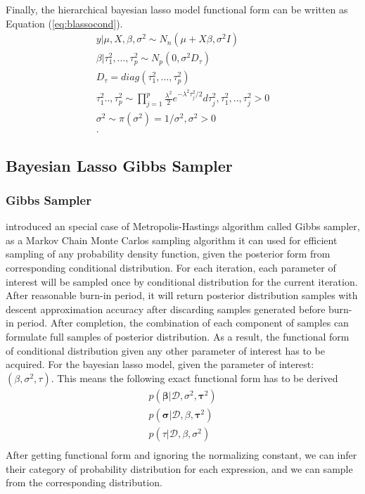 Finally, the hierarchical bayesian lasso model functional form can be written as Equation (\ref{eq:blassocond}).
\begin{equation}
	\label{eq:blassocond}
	\begin{multlined}
	y|\mu,X,\beta,\sigma^2 \sim N_n(\mu + X\beta,\sigma^2I)\\
	\beta|\tau_1^2,...,\tau_p^2 \sim N_p(0,\sigma^2D_{\tau})\\
	D_{\tau} = diag(\tau_1^2,...,\tau_p^2)\\
	\tau_1^2..,\tau_p^2 \sim \prod_{j=1}^p \frac{\lambda^2}{2} e^{-\lambda^2\tau_j^2/2}d\tau_j^2, \tau_1^2,..,\tau_j^2 > 0\\
	\sigma^2 \sim \pi(\sigma^2) = 1/\sigma^2, \sigma^2 > 0\\.
	\end{multlined}
\end{equation}

\subsection{Bayesian Lasso Gibbs Sampler}
\subsubsection{Gibbs Sampler}
\cite{4767596} introduced an special case of Metropolis-Hastings algorithm called Gibbs sampler, as a Markov Chain Monte Carlos sampling algorithm it can used for efficient sampling of any probability density function, given the posterior form from corresponding conditional distribution. For each iteration, each parameter of interest will be sampled once by conditional distribution for the current iteration. After reasonable burn-in period, it will return posterior distribution samples with descent approximation accuracy after discarding samples generated before burn-in period.
After completion, the combination of each component of samples can formulate full samples of posterior distribution. As a result, the functional form of conditional distribution given any other parameter of interest has to be acquired. For the bayesian lasso model, given the parameter of interest: $(\beta,\sigma^2,\tau)$. This means the following exact functional form has to be derived
\begin{equation}
	\begin{multlined}
	p(\mathbf{\beta}|\mathcal{D},\sigma^2,\mathbf{\tau}^2)\\
	p(\mathbf{\sigma}|\mathcal{D},\beta,\mathbf{\tau}^2)\\
	p(\tau|\mathcal{D},\beta,\sigma^2)\\
	\end{multlined}
\end{equation}
After getting functional form and ignoring the normalizing constant, we can infer their category of probability distribution for each expression, and we can sample from the corresponding distribution.

